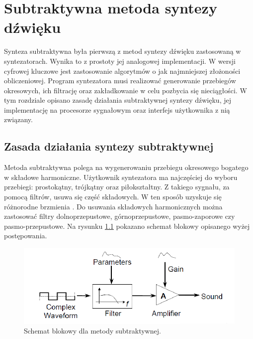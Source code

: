 \chapter{Subtraktywna metoda syntezy dźwięku}\label{chapter_subtractive}
Synteza subtraktywna była pierwszą z metod syntezy dźwięku zastosowaną w syntezatorach. Wynika to z prostoty jej analogowej implementacji. W wersji cyfrowej kluczowe jest zastosowanie algorytmów o jak najmniejszej złożoności obliczeniowej. Program syntezatora musi realizować generowanie przebiegów okresowych, ich filtrację oraz zakładkowanie w celu pozbycia się nieciągłości. W tym rozdziale opisano zasadę działania subtraktywnej syntezy dźwięku, jej implementację na procesorze sygnałowym oraz interfejs użytkownika z nią związany.
\section{Zasada działania syntezy subtraktywnej}
Metoda subtraktywna polega na wygenerowaniu przebiegu okresowego bogatego w składowe harmoniczne. Użytkownik syntezatora ma najczęściej do wyboru przebiegi: prostokątny, trójkątny oraz piłokształtny. Z takiego sygnału, za pomocą filtrów, usuwa się część składowych. W ten sposób uzyskuje się różnorodne brzmienia \cite{alles}. Do usuwania składowych harmonicznych można zastosować filtry dolnoprzepustowe, górnoprzepustowe, pasmo-zaporowe czy pasmo-przepustowe. Na rysunku \ref{rys:sub_diagram} pokazano schemat blokowy opisanego wyżej postępowania.

\begin{figure}[H]
	\centering
	\includegraphics[width=12cm]{grafiki/sub_diagram}
	\captionsetup{justification=centering}
	\caption{Schemat blokowy dla metody subtraktywnej.}
	\label{rys:sub_diagram}
\end{figure}

